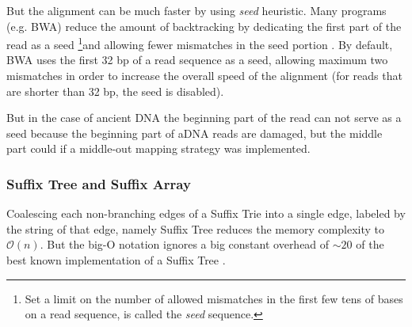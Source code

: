 \documentclass[11pt,a4paper]{report}
\begin{document}
But the alignment can be much faster by using \emph{seed} 
heuristic. 
Many programs (e.g. BWA) reduce the amount of backtracking  
by dedicating the first part of the read as a seed 
\footnote{ Set a limit on the number of allowed mismatches 
in the first few tens of bases on a read sequence, is called
the \emph{seed} sequence.}and allowing fewer mismatches in 
the seed portion \cite{bwa}. By default, BWA uses the first 
32 bp of a read sequence as a seed, allowing maximum two 
mismatches in order to increase the overall speed of the 
alignment (for reads that are shorter than 32 bp, the seed 
is disabled)\cite{bwa}. 

But in the case of ancient DNA the beginning part of the 
read can not serve as a seed because the beginning part of 
aDNA reads are damaged, but the middle part could if a 
middle-out mapping strategy was implemented.




\subsubsection{Suffix Tree and Suffix Array}
\label{Suffix Tree and Suffix Array}

Coalescing each non-branching edges of a Suffix Trie into 
a single edge, labeled by the string of that edge, namely 
Suffix Tree reduces the memory complexity to $\mathcal{O}(n)$.
But the big-O notation ignores a big constant overhead 
of $\sim20$ of the best known implementation of a Suffix Tree
\cite{gusfield1997algorithms}.\\ 
\end{document}
